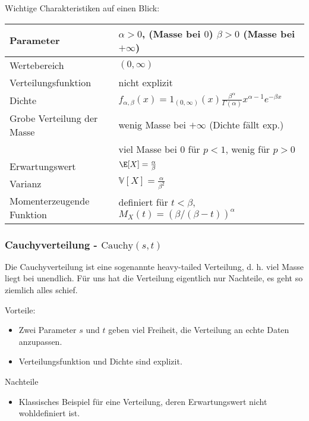 Wichtige Charakteristiken auf einen Blick:
\begin{center}
\begin{tabular}[h]{|l|l|}
\hline
Parameter& $\alpha>0$, (Masse bei $0$) $\beta>0$ (Masse bei $+\infty$)\\
\hline
Wertebereich & $(0,\infty)$\\
\hline
Verteilungsfunktion & nicht explizit\\
\hline
Dichte & $f_{\alpha,\beta}(x)= 1_{(0,\infty)}(x) \frac{\beta^\alpha}{\Gamma(\alpha)} x^{\alpha-1} e^{-\beta x}$\\
\hline
Grobe Verteilung der Masse & wenig Masse bei $+\infty$ (Dichte f\"allt exp.)\\
& viel Masse bei $0$ f\"ur $p<1$, wenig f\"ur $p>0$\\
\hline
Erwartungswert& $\E[X]=\frac{\alpha}{\beta}$ \\
\hline
Varianz & $\mathbb V[X]=\frac{\alpha}{\beta^2}$\\
\hline
Momenterzeugende Funktion& definiert f\"ur $t<\beta$, $M_X(t)=(\beta/(\beta-t))^\alpha$\\
\hline
\end{tabular}
\end{center}


\subsubsection*{Cauchyverteilung - $\text{Cauchy}(s,t)$}
Die Cauchyverteilung ist eine sogenannte \glqq heavy-tailed\grqq{} Verteilung, d. h. viel Masse liegt bei unendlich. F\"ur uns hat die Verteilung eigentlich nur Nachteile, es geht so ziemlich alles schief.

{Vorteile:} 
\begin{itemize}
\item	Zwei Parameter $s$ und $t$ geben viel Freiheit, die Verteilung an echte Daten anzupassen. 
\item Verteilungsfunktion und Dichte sind explizit. 
\end{itemize}

{Nachteile}
\begin{itemize}
	\item Klassisches Beispiel f\"ur eine Verteilung, deren Erwartungswert nicht wohldefiniert ist.
\end{itemize}

